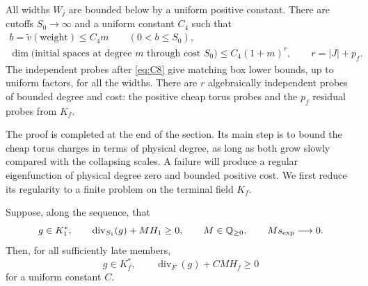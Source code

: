 \begin{proposition}\label{b:bounded-axes-estimates}
All widths \(W_j\) are bounded below by a uniform positive constant.
There are cutoffs \(S_0\to\infty\) and a uniform constant \(C_4\) such
that
\begin{equation}\label{eq:D3}
\begin{gathered}
 b=\tilde v(\text{weight})\leq C_4m
       \qquad(0<b\leq S_0),\\
 \dim\bigl(\text{initial spaces at degree }m
                  \text{ through cost }S_0\bigr)
       \leq C_4(1+m)^r,
 \qquad r=|J|+p_f.
\end{gathered}
\end{equation}
The independent probes after \eqref{eq:C8} give matching box lower bounds,
up to uniform factors, for all the widths. There are \(r\) algebraically independent probes
of bounded degree and cost: the positive cheap torus probes and the
\(p_f\) residual probes from \(K_f\).
\end{proposition}

The proof is completed at the end of the section. Its main step is to
bound the cheap torus charges in terms of physical degree, as long as
both grow slowly compared with the collapsing scales. A failure will
produce a regular eigenfunction of physical degree zero and bounded
positive cost. We first reduce its regularity to a finite problem on
the terminal field \(K_f\).

\begin{lemma}\label{b:pure-descent}
Suppose, along the sequence, that
\[
 g\in K_1^*,\qquad \operatorname{div}_{S_1}(g)+MH_1\geq0,
 \qquad M\in\mathbb Q_{\geq0},\qquad Ms_{\exp}\longrightarrow0.
\]
Then, for all sufficiently late members,
\[
 g\in K_f^*,\qquad \operatorname{div}_{F}(g)+CMH_f\geq0
\]
for a uniform constant \(C\).
\end{lemma}

